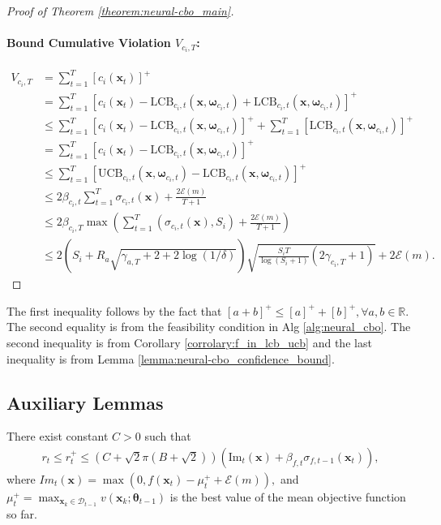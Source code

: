 \begin{proof} [Proof of Theorem \ref{theorem:neural-cbo_main}]
\paragraph{Bound Cumulative Violation $V_{c_i, T}$:}
\begin{align*}
V_{c_i, T}  & = \sum_{t=1}^T [c_i(\mathbf{x}_t)]^+ \\
& = \sum_{t=1}^T[c_i(\mathbf{x}_t) - \text{LCB}_{c_i,t}(\mathbf{x}, \boldsymbol{\omega}_{c_i,t}) + \text{LCB}_{c_i,t}(\mathbf{x}, \boldsymbol{\omega}_{c_i,t})]^+
\\
& \le \sum_{t=1}^T[c_i(\mathbf{x}_t) - \text{LCB}_{c_i,t}(\mathbf{x}, \boldsymbol{\omega}_{c_i,t})]^+  + \sum_{t=1}^T [\text{LCB}_{c_i,t}(\mathbf{x}, \boldsymbol{\omega}_{c_i,t})]^+ 
\\
& = \sum_{t=1}^T[c_i(\mathbf{x}_t) - \text{LCB}_{c_i,t}(\mathbf{x}, \boldsymbol{\omega}_{c_i,t})]^+
\\
& \le \sum_{t=1}^T[\text{UCB}_{c_i,t}(\mathbf{x}, \boldsymbol{\omega}_{c_i,t}) - \text{LCB}_{c_i,t}(\mathbf{x}, \boldsymbol{\omega}_{c_i,t})]^+
\\
& \le 2 \beta_{c_i,t} \sum_{t=1}^T \sigma_{c_i,t}(\mathbf{x})  + \frac{2 \mathcal{E}(m)}{T+1} 
\\ 
& \le 2 \beta_{c_i,T} \max\left (\sum_{t=1}^T \left(\sigma_{c_i,t}(\mathbf{x}), S_i \right)  + \frac{2 \mathcal{E}(m)}{T+1}  \right)
\\
& \le 2 \left(S_i + R_a \sqrt{\gamma_{a,T} + 2 + 2 \log(1/\delta)} \right) \sqrt{\frac{ S_i T}{\log(S_i+1)} (2\gamma_{c_i,T}+1)} + 2 \mathcal{E}(m).
\end{align*}
\end{proof}

The first inequality follows by the fact that $[a+b]^+ \le [a]^+ + [b]^+, \forall a,b \in \mathbb{R}$. The second equality is from the feasibility condition in Alg \ref{alg:neural_cbo}. The second inequality is from Corollary  \ref{corrolary:f_in_lcb_ucb} and the last inequality is from Lemma \ref{lemma:neural-cbo_confidence_bound}. 



\subsection{Auxiliary Lemmas}
\label{section:neural-cbo_aux_appendix}
\begin{auxlemma}
    \label{lemma:neural_cbo_objective_rt}
    There exist constant $C > 0$ such that
    \begin{align*}
        r_t \le r_t^+ \le \left(C + \sqrt{2}\pi(B + \sqrt{2}) \right)\left(\text{Im}_t (\mathbf{x})+ \beta_{f,t} \sigma_{f,t-1}(\mathbf{x}_t) \right),
    \end{align*}
    where $Im_t (\mathbf{x}) = \max(0, f(\mathbf{x}_t) - \mu_t^+ + \mathcal{E}(m)), $ and $\mu^+_t = \max_{\mathbf{x}_k \in \mathcal{D}_{t-1}} v(\mathbf{x}_k; \boldsymbol{\theta}_{t-1})$ is the best value of the mean objective function so far. 
\end{auxlemma}

